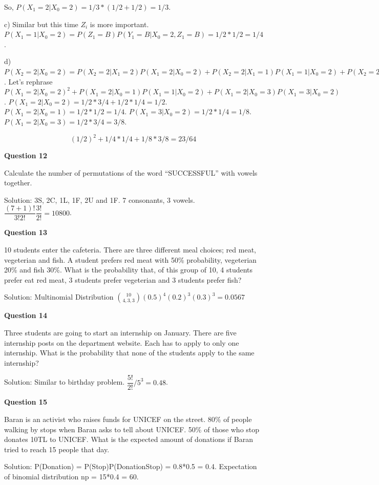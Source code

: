\documentclass[]{book}
\theoremstyle{definition}
\theoremstyle{definition}
\theoremstyle{definition}
\theoremstyle{remark}
\begin{document}
So, \(P(X_1 = 2 | X_0 = 2) = 1/3*(1/2 + 1/2) = 1/3\).

c) Similar but this time \(Z_i\) is more important.
\(P(X_1 = 1 | X_0 = 2) = P(Z_1 = B)P(Y_1 = B|X_0=2,Z_1=B) = 1/2*1/2=1/4\).

d)
\(P(X_2 = 2 | X_0 = 2) = P(X_2 = 2 | X_1 = 2)P(X_1 = 2 | X_0 = 2) + P(X_2 = 2 | X_1 = 1)P(X_1 = 1 | X_0 = 2) + P(X_2 = 2 | X_1 = 3)P(X_1 = 3 | X_0 = 2)\).
Let's rephrase
\(P(X_1 = 2 | X_0 = 2)^2 + P(X_1 = 2 | X_0 = 1)P(X_1 = 1 | X_0 = 2) + P(X_1 = 2 | X_0 = 3)P(X_1 = 3 | X_0 = 2)\).
\(P(X_1 = 2 | X_0 = 2) = 1/2*3/4 + 1/2*1/4 = 1/2\).
\(P(X_1 = 2|X_0 = 1) = 1/2*1/2 = 1/4\).
\(P(X_1 = 3|X_0 = 2) = 1/2*1/4 = 1/8\).
\(P(X_1 = 2|X_0 = 3) = 1/2*3/4 = 3/8\).

\[(1/2)^2 + 1/4 * 1/4 + 1/8*3/8 = 23/64\]

\textbf{Question 12}

Calculate the number of permutations of the word ``SUCCESSFUL'' with
vowels together.

Solution: 3S, 2C, 1L, 1F, 2U and 1F. 7 consonants, 3 vowels.
\(\dfrac{(7+1)!}{3!2!}\dfrac{3!}{2!}=10800\).

\textbf{Question 13}

10 students enter the cafeteria. There are three different meal choices;
red meat, vegeterian and fish. A student prefers red meat with 50\%
probability, vegeterian 20\% and fish 30\%. What is the probability
that, of this group of 10, 4 students prefer eat red meat, 3 students
prefer vegeterian and 3 students prefer fish?

Solution: Multinomial Distribution
\(\binom{10}{4,3,3}(0.5)^4(0.2)^3(0.3)^3 = 0.0567\)

\textbf{Question 14}

Three students are going to start an internship on January. There are
five internship posts on the department website. Each has to apply to
only one internship. What is the probability that none of the students
apply to the same internship?

Solution: Similar to birthday problem. \(\dfrac{5!}{2!}/5^3 = 0.48\).

\textbf{Question 15}

Baran is an activist who raises funds for UNICEF on the street. 80\% of
people walking by stops when Baran asks to tell about UNICEF. 50\% of
those who stop donates 10TL to UNICEF. What is the expected amount of
donations if Baran tried to reach 15 people that day.

Solution: P(Donation) = P(Stop)P(Donation\textbar{}Stop) = 0.8*0.5 =
0.4. Expectation of binomial distribution np = 15*0.4 = 60.
\end{document}

